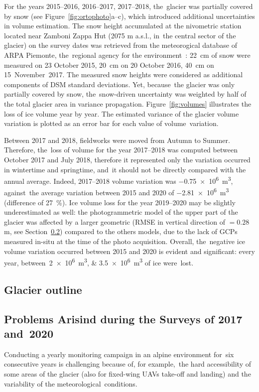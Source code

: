 For the years 2015--2016, 2016--2017, 2017--2018, the~glacier was partially covered by snow (see Figure~\ref{fig:ortophoto}a--c), which introduced additional uncertainties in volume estimation. 
The snow height accumulated at the nivometric station located near Zamboni Zappa Hut (2075 m a.s.l., in~the central sector of the glacier) on the survey dates was retrieved from the meteorogical database of ARPA Piemonte, the~regional agency for the environment~\cite{arpaPie}: \SI{22}{\centi\meter} of snow were measured on 23 October 2015, \SI{20}{\centi\meter} on 20 October 2016, \SI{40}{\centi\meter} on \mbox{15 November 2017}.
The measured snow heights were considered as additional components of DSM standard deviations.
Yet, because~the glacier was only partially covered by snow, the~snow-driven uncertainty was weighted by half of the total glacier area in variance propagation. 
Figure~\ref{fig:volumes} illustrates the loss of ice volume year by year. 
The estimated variance of the glacier volume variation is plotted as an error bar for each value of volume~variation.

Between 2017 and 2018, fieldworks were moved from Autumn to Summer.
Therefore, the~loss of volume for the year 2017--2018 was computed between October 2017 and July 2018, therefore it represented only the variation occurred in wintertime and springtime, and~it should not be directly compared with the annual average.
Indeed, 2017--2018 volume variation was \SI{-0.75e6}{\cubic\meter}, against~the average variation between 2015 and 2020 of \SI{-2.81e6}{\cubic\meter} (difference of \SI{27}{\percent}).
Ice volume loss for the year 2019--2020 may be slightly underestimated as well: the photogrammetric model of the upper part of the glacier was affected by a larger geometric (RMSE in vertical direction of $ = 0.28 $ \si{\meter}, see Section~\ref{sec:problems}) compared to the others models, due to the lack of GCPs measured in-situ at the time of the photo acquisition. 
Overall, the~negative ice volume variation occurred between 2015 and 2020 is evident and significant: every year, between~\SIlist{2e6;3.5e6}{\cubic\meter} of ice were~lost. 

\subsection{Glacier outline}

\subsection{Problems Arisind during the Surveys of 2017 and~2020} \label{sec:problems}
Conducting a yearly monitoring campaign in an alpine environment for~six consecutive years is challenging because of, for example,~the hard accessibility of some areas of the glacier (also for fixed-wing UAVs take-off and landing) and the variability of the meteorological~conditions.

